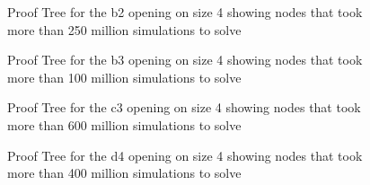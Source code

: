 \begin{figure}
\centering

\caption{Proof Tree for the b2 opening on size 4 showing nodes that took more than 250 million simulations to solve}
\label{fig:proof-b2}
\end{figure}

\begin{figure}
\centering

\caption{Proof Tree for the b3 opening on size 4 showing nodes that took more than 100 million simulations to solve}
\label{fig:proof-b3}
\end{figure}

\begin{figure}
\centering

\caption{Proof Tree for the c3 opening on size 4 showing nodes that took more than 600 million simulations to solve}
\label{fig:proof-c3}
\end{figure}

\begin{figure}
\centering

\caption{Proof Tree for the d4 opening on size 4 showing nodes that took more than 400 million simulations to solve}
\label{fig:proof-d4}
\end{figure}

